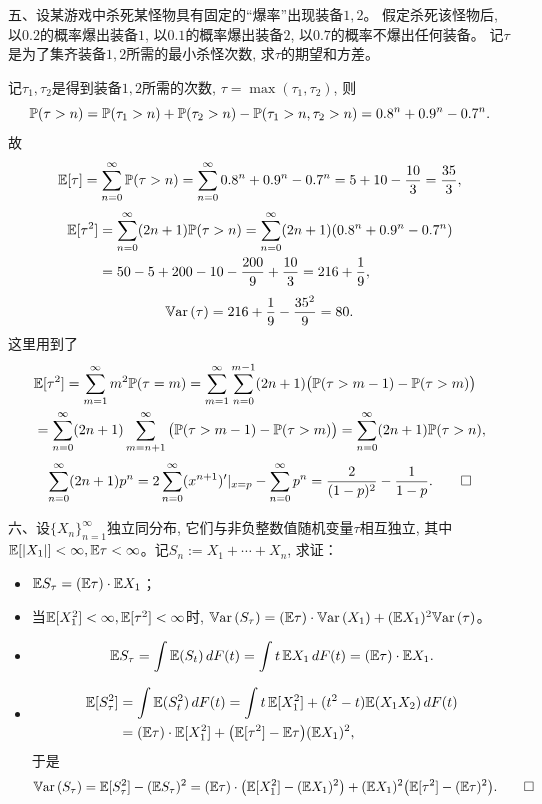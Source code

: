 五、设某游戏中杀死某怪物具有固定的“爆率”出现装备$1,2$。
假定杀死该怪物后, 以$0.2$的概率爆出装备$1$, 以$0.1$的概率爆出装备$2$, 
以$0.7$的概率不爆出任何装备。
记$\tau$是为了集齐装备$1,2$所需的最小杀怪次数, 求$\tau$的期望和方差。
\begin{proofc}[解答]
记$\tau_1,\tau_2$是得到装备$1,2$所需的次数, $\tau=\max(\tau_1,\tau_2)$, 则
\[\mathbb{P}(\tau>n)=\mathbb{P}(\tau_1>n)+\mathbb{P}(\tau_2>n)-\mathbb{P}(\tau_1>n,\tau_2>n)
=0.8^n+0.9^n-0.7^n.\]
故
\[\mathbb{E}[\tau]=\sum_{n=0}^\infty\mathbb{P}(\tau>n)
=\sum_{n=0}^\infty0.8^n+0.9^n-0.7^n=5+10-\frac{10}{3}=\frac{35}{3},\]
\begin{align*}\mathbb{E}[\tau^2]&=\sum_{n=0}^\infty(2n+1)\mathbb{P}(\tau>n)
=\sum_{n=0}^\infty(2n+1)(0.8^n+0.9^n-0.7^n)\\
&=50-5+200-10-\frac{200}{9}+\frac{10}{3}=216+\frac{1}{9},\end{align*}
\[\mathbb{V}\mathrm{ar}\,(\tau)=216+\frac{1}{9}-\frac{35^2}{9}=80.\]
这里用到了
\begin{align*}&\mathbb{E}[\tau^2]=\sum_{m=1}^\infty m^2\mathbb{P}(\tau=m)
=\sum_{m=1}^\infty\sum_{n=0}^{m-1}(2n+1)\big(\mathbb{P}(\tau>m-1)-\mathbb{P}(\tau>m)\big)\\
&=\sum_{n=0}^\infty(2n+1)\sum_{m=n+1}^\infty\big(\mathbb{P}(\tau>m-1)-\mathbb{P}(\tau>m)\big)
=\sum_{n=0}^\infty(2n+1)\mathbb{P}(\tau>n),\end{align*}
\[\sum_{n=0}^\infty(2n+1)p^n
=2\sum_{n=0}^\infty(x^{n+1})'|_{x=p}-\sum_{n=0}^\infty p^n
=\frac{2}{(1-p)^2}-\frac{1}{1-p}.\qedhere\]
\end{proofc}

六、设$\{X_n\}_{n=1}^\infty$独立同分布, 它们与非负整数值随机变量$\tau$相互独立, 其中
$\mathbb{E}[|X_1|]<\infty,\mathbb{E}\tau<\infty$。记$S_n:=X_1+\cdots+X_n$, 求证：
\begin{itemize}
    \item[(1)] $\mathbb{E} S_\tau=(\mathbb{E}\tau)\cdot\mathbb{E} X_1$；
    \item[(2)] 当$\mathbb{E}[X_1^2]<\infty,\mathbb{E}[\tau^2]<\infty$时, 
    $\mathbb{V}\mathrm{ar}\,(S_\tau)
    =(\mathbb{E}\tau)\cdot\mathbb{V}\mathrm{ar}\,(X_1)
    +(\mathbb{E} X_1)^2\mathbb{V}\mathrm{ar}\,(\tau)$。
\end{itemize}
\begin{proofc}
\begin{itemize}
    \item[(1)] $$\mathbb{E} S_\tau=\int\mathbb{E}(S_t)\,dF(t)
    =\int t\,\mathbb{E} X_1\,dF(t)=(\mathbb{E}\tau)\cdot\mathbb{E} X_1.$$
    \item[(2)] \begin{align*}
        \mathbb{E}[S_\tau^2]&=\int\mathbb{E}(S_t^2)\,dF(t)
        =\int t\,\mathbb{E}[X_1^2]+(t^2-t)\mathbb{E}(X_1X_2)\,dF(t)\\
        &=(\mathbb{E}\tau)\cdot\mathbb{E}[X_1^2]+\big(\mathbb{E}[\tau^2]-\mathbb{E}\tau\big)(\mathbb{E} X_1)^2,
    \end{align*}
    于是$$\mathbb{V}\mathrm{ar}\,(S_\tau)=\mathbb{E}[S_\tau^2]-(\mathbb{E} S_\tau)^2
    =(\mathbb{E}\tau)\cdot\big(\mathbb{E}[X_1^2]-(\mathbb{E} X_1)^2\big)
    +(\mathbb{E} X_1)^2\big(\mathbb{E}[\tau^2]-(\mathbb{E}\tau)^2\big).\qedhere$$
\end{itemize}
\end{proofc}

